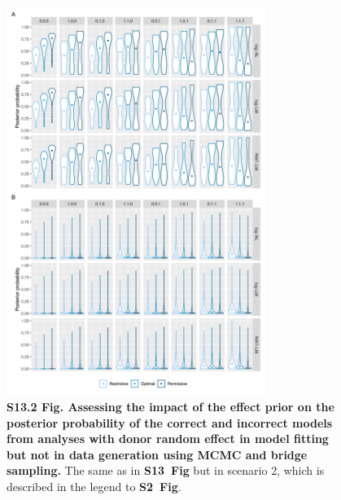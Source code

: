 \documentclass[11pt]{article}
\newcommand{\sfigroccmcmc}{\textbf{S2~Fig}\xspace}
\newcommand{\sfigppeffectone}{\textbf{S13~Fig}\xspace}
\begin{document}
\begin{figure}[!ht]
\begin{center}
  \includegraphics[width=0.75\textwidth]{png/sim_vln_effect_mcmc_bs_noranef_ranef.png}
\end{center}  
\caption{
  {\bf
    S13.2 Fig.
    Assessing the impact of the effect prior on the posterior probability of the correct and incorrect models from analyses with donor random effect in model fitting but not in data generation using MCMC and bridge sampling.}
The same as in \sfigppeffectone but in scenario 2, which is described in the legend to \sfigroccmcmc.
}
\label{s-fig:sim-effect-mcmc-noranef-ranef}
\end{figure}
\end{document}
